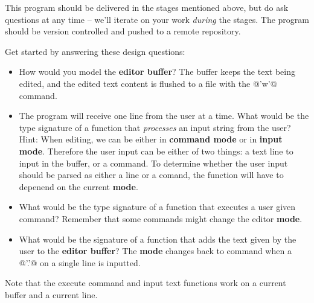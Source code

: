 \documentclass[a4paper,10pt]{article}
\begin{document}
This program should be delivered in the stages mentioned above, but do
ask questions at any time -- we'll iterate on your work \emph{during} the stages.
The program should be version controlled and pushed to a remote repository.

Get started by answering these design questions:

\begin{itemize}
    \item How would you model the \textbf{editor buffer}? The buffer keeps the text being
    edited, and the edited text content is flushed to a file with the @'w'@ command.

    \item The program will receive one line from the user at a time. What would be the
    type signature of a function that \emph{processes} an input string from the
    user? Hint: When editing, we can be either in \textbf{command mode} or in
    \textbf{input mode}. Therefore the user input can be either of two things: a
    text line to input in the buffer, or a command. To determine whether the user
    input should be parsed as either a line or a comand, the function will have to
    depenend on the current \textbf{mode}.

    \item What would be the type signature of a function that executes a user
    given command? Remember that some commands might change the editor \textbf{mode}.

    \item What would be the signature of a function that adds the text given by the user
    to the \textbf{editor buffer}? The \textbf{mode} changes back to command when a
    @'.'@ on a single line is inputted.
\end{itemize}

Note that the execute command and input text functions work on a current buffer and a current line.
\end{document}
